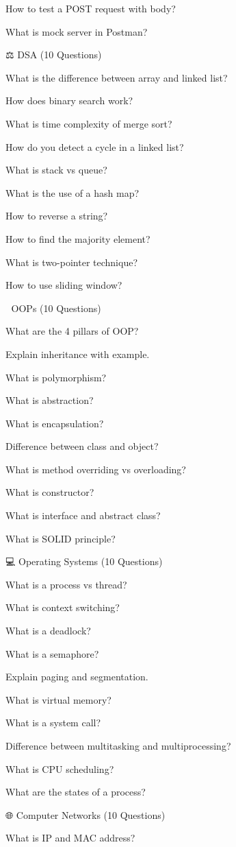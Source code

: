 How to test a POST request with body?

What is mock server in Postman?

⚖️ DSA (10 Questions)

What is the difference between array and linked list?

How does binary search work?

What is time complexity of merge sort?

How do you detect a cycle in a linked list?

What is stack vs queue?

What is the use of a hash map?

How to reverse a string?

How to find the majority element?

What is two-pointer technique?

How to use sliding window?

🧠 OOPs (10 Questions)

What are the 4 pillars of OOP?

Explain inheritance with example.

What is polymorphism?

What is abstraction?

What is encapsulation?

Difference between class and object?

What is method overriding vs overloading?

What is constructor?

What is interface and abstract class?

What is SOLID principle?

💻 Operating Systems (10 Questions)

What is a process vs thread?

What is context switching?

What is a deadlock?

What is a semaphore?

Explain paging and segmentation.

What is virtual memory?

What is a system call?

Difference between multitasking and multiprocessing?

What is CPU scheduling?

What are the states of a process?

🌐 Computer Networks (10 Questions)

What is IP and MAC address?

